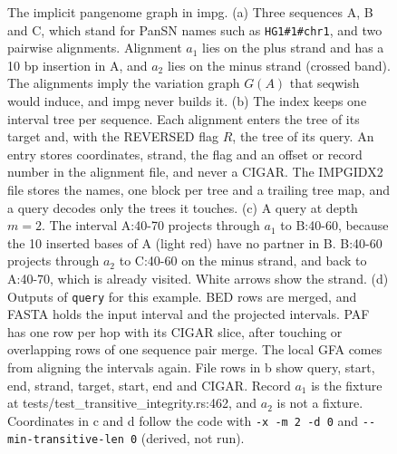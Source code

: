 \begin{figure}[t]
{%
}
\caption{The implicit pangenome graph in impg.
(a) Three sequences A, B and C, which stand for PanSN names such as \texttt{HG1\#1\#chr1}, and two pairwise alignments.
Alignment $a_1$ lies on the plus strand and has a 10 bp insertion in A, and $a_2$ lies on the minus strand (crossed band).
The alignments imply the variation graph $G(A)$ that seqwish would induce, and impg never builds it.
(b) The index keeps one interval tree per sequence.
Each alignment enters the tree of its target and, with the REVERSED flag $R$, the tree of its query.
An entry stores coordinates, strand, the flag and an offset or record number in the alignment file, and never a CIGAR.
The IMPGIDX2 file stores the names, one block per tree and a trailing tree map, and a query decodes only the trees it touches.
(c) A query at depth $m=2$.
The interval A:40-70 projects through $a_1$ to B:40-60, because the 10 inserted bases of A (light red) have no partner in B.
B:40-60 projects through $a_2$ to C:40-60 on the minus strand, and back to A:40-70, which is already visited.
White arrows show the strand.
(d) Outputs of \texttt{query} for this example.
BED rows are merged, and FASTA holds the input interval and the projected intervals.
PAF has one row per hop with its CIGAR slice, after touching or overlapping rows of one sequence pair merge.
The local GFA comes from aligning the intervals again.
File rows in b show query, start, end, strand, target, start, end and CIGAR.
Record $a_1$ is the fixture at tests/test\_transitive\_integrity.rs:462, and $a_2$ is not a fixture.
Coordinates in c and d follow the code with \texttt{-x -m 2 -d 0} and \texttt{-{}-min-transitive-len 0} (derived, not run).}
\label{fig:overview}
\end{figure}

